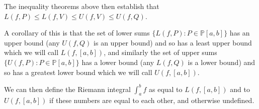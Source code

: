 \documentclass[12pt]{article}
\begin{document}
The inequality theorems above then establish that $L(f,P) \leq L(f,V) \leq U(f,V) \leq U(f,Q)$.

A corollary of this is that the set of lower sums $\{L(f,P):P \in \mathbb P[a,b]\}$ has an upper bound (any $U(f,Q)$ is an upper bound) and so has a least upper bound which we will
call $L(f,[a,b])$, and similarly the set of  upper sums $\{U(f,P):P \in \mathbb P[a,b]\}$ has a lower bound (any $L(f,Q)$ is a lower bound)  and so has a greatest lower bound
which we will call $U(f,[a,b])$.

We can then define the Riemann integral $\int_a^b f$ as equal to $L(f,[a,b])$ and to $U(f,[a,b])$ if these numbers are equal to each other, and otherwise undefined.
\end{document}
